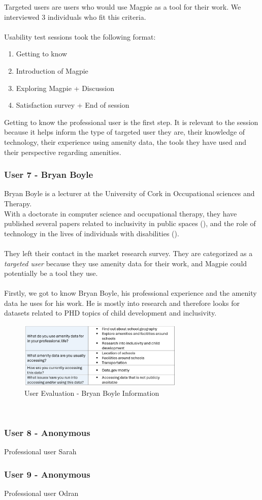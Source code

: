 Targeted users are users who would use Magpie as a tool for their work. We interviewed 3 individuals who fit this criteria.\\ \\
Usability test sessions took the following format:
\begin{enumerate}
    \item Getting to know
    \item Introduction of Magpie
    \item Exploring Magpie + Discussion
    \item Satisfaction survey + End of session
\end{enumerate}
Getting to know the professional user is the first step. It is relevant to the session because it helps inform the type of targeted user they are, their knowledge of technology, their experience using amenity data, the tools they have used and their perspective regarding amenities.

\subsubsection{User 7 - Bryan Boyle}
Bryan Boyle is a lecturer at the University of Cork in Occupational sciences and Therapy.\\ With a doctorate in computer science and occupational therapy, they have published several papers related to inclusivity in public spaces (\cite{bryanboyleplaygroundinclusion2023}), and the role of technology in the lives of individuals with disabilities (\cite{bryanboylechildrenautism2022}).\\ \\
They left their contact in the market research survey. They are categorized as a \emph{targeted user} because they use amenity data for their work, and Magpie could potentially be a tool they use.\\ \\

\noindent Firstly, we got to know Bryan Boyle, his professional experience and the amenity data he uses for his work. He is mostly into research and therefore looks for datasets related to PHD topics of child development and inclusivity.
\begin{figure}[h!]
    \centering
    \includegraphics[width=0.7\textwidth]{images/bryan-amenity-info.png}
    \caption{User Evaluation - Bryan Boyle Information}
\end{figure}\\


\newpage
\subsubsection{User 8 - Anonymous}
Professional user Sarah

\newpage
\subsubsection{User 9 - Anonymous}
Professional user Odran